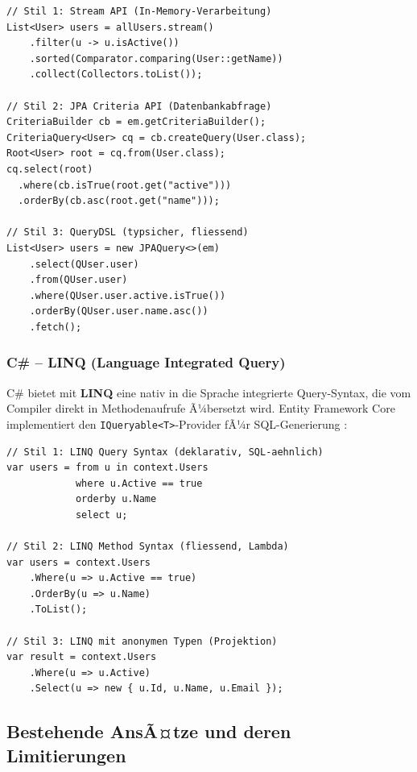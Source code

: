 \begin{lstlisting}[style=javastyle, caption={Java -- Query-Stilarten},
  label=lst:java_styles]
// Stil 1: Stream API (In-Memory-Verarbeitung)
List<User> users = allUsers.stream()
    .filter(u -> u.isActive())
    .sorted(Comparator.comparing(User::getName))
    .collect(Collectors.toList());

// Stil 2: JPA Criteria API (Datenbankabfrage)
CriteriaBuilder cb = em.getCriteriaBuilder();
CriteriaQuery<User> cq = cb.createQuery(User.class);
Root<User> root = cq.from(User.class);
cq.select(root)
  .where(cb.isTrue(root.get("active")))
  .orderBy(cb.asc(root.get("name")));

// Stil 3: QueryDSL (typsicher, fliessend)
List<User> users = new JPAQuery<>(em)
    .select(QUser.user)
    .from(QUser.user)
    .where(QUser.user.active.isTrue())
    .orderBy(QUser.user.name.asc())
    .fetch();
\end{lstlisting}

\subsubsection{C\# -- LINQ (Language Integrated Query)}

C\# bietet mit \textbf{LINQ} eine nativ in die Sprache integrierte
Query-Syntax, die vom Compiler direkt in Methodenaufrufe Ã¼bersetzt wird.
Entity Framework Core implementiert den \texttt{IQueryable<T>}-Provider
fÃ¼r SQL-Generierung \cite{ef_core_docs,linq_docs}:

\begin{lstlisting}[style=csharpstyle, caption={C\# LINQ -- Query-Stilarten},
  label=lst:cs_styles]
// Stil 1: LINQ Query Syntax (deklarativ, SQL-aehnlich)
var users = from u in context.Users
            where u.Active == true
            orderby u.Name
            select u;

// Stil 2: LINQ Method Syntax (fliessend, Lambda)
var users = context.Users
    .Where(u => u.Active == true)
    .OrderBy(u => u.Name)
    .ToList();

// Stil 3: LINQ mit anonymen Typen (Projektion)
var result = context.Users
    .Where(u => u.Active)
    .Select(u => new { u.Id, u.Name, u.Email });
\end{lstlisting}

\subsection{Bestehende AnsÃ¤tze und deren Limitierungen}
\label{subsec:bestehend}

